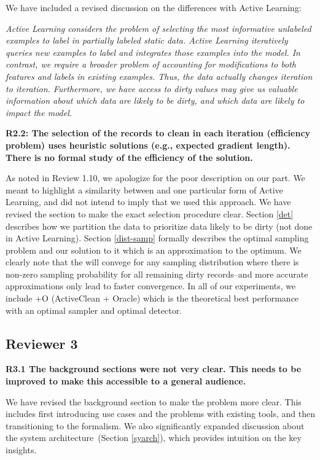\noindent  We have included a revised discussion on the differences with Active Learning:

\emph{Active Learning considers the problem of selecting the most informative unlabeled examples to label in partially labeled static data.
Active Learning iteratively queries new examples to label and integrates those examples into the model.
In contrast, we require a broader problem of accounting for modifications to both features and labels in existing examples.
Thus, the data actually changes iteration to iteration.
Furthermore, we have access to dirty values may give us valuable information about which data are likely to be dirty, and which data are likely to impact the model. }

\vspace{0.5em}

\noindent\textbf{R2.2: The selection of the records to clean in each iteration (efficiency problem) uses heuristic solutions (e.g., expected gradient length). There is no formal study of the efficiency of the solution.}

\noindent  As noted in Review 1.10, we apologize for the poor description on our part. We meant to highlight a similarity between \sys and one particular form of Active Learning, and did not intend to imply that we used this approach. 
We have revised the section to make the exact selection procedure clear. Section \ref{det} describes how we partition the data to prioritize data likely to be dirty (not done in Active Learning). Section \ref{dist-samp} formally describes the optimal sampling problem and our solution to it which is an approximation to the optimum. We clearly note that the \sys will convege for any sampling distribution where there is non-zero sampling probability for all remaining dirty records--and more accurate approximations only lead to faster convergence. In all of our experiments, we include \sys+O (ActiveClean + Oracle) which is the theoretical best performance with an optimal sampler and optimal detector.

 \subsection*{Reviewer 3}

\noindent\textbf{R3.1 The background sections were not very clear. This needs to be improved
to make this accessible to a general audience.}

\noindent  We have revised the background section to make the problem more clear. This includes first introducing use cases and the problems with existing tools, and then transitioning to the formalism. We also significantly expanded discussion about the system architecture~(Section \ref{syarch}), which provides intuition on the key insights.

